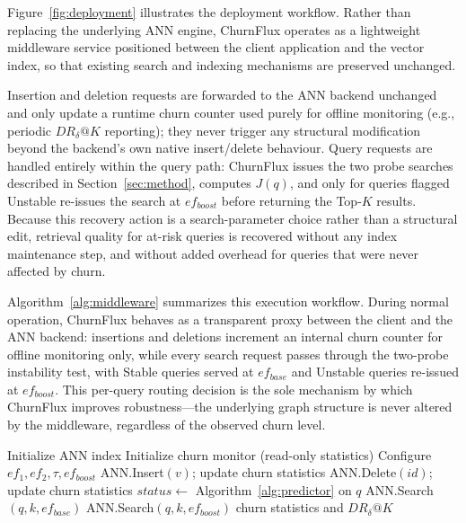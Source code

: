 \documentclass{ieeeaccess}
\begin{document}
Figure~\ref{fig:deployment} illustrates the deployment workflow. Rather than replacing the underlying ANN engine, ChurnFlux operates as a lightweight middleware service positioned between the client application and the vector index, so that existing search and indexing mechanisms are preserved unchanged.

Insertion and deletion requests are forwarded to the ANN backend unchanged and only update a runtime churn counter used purely for offline monitoring (e.g., periodic $DR_{\delta}@K$ reporting); they never trigger any structural modification beyond the backend's own native insert/delete behaviour. Query requests are handled entirely within the query path: ChurnFlux issues the two probe searches described in Section~\ref{sec:method}, computes $J(q)$, and only for queries flagged Unstable re-issues the search at $ef_{boost}$ before returning the Top-$K$ results. Because this recovery action is a search-parameter choice rather than a structural edit, retrieval quality for at-risk queries is recovered without any index maintenance step, and without added overhead for queries that were never affected by churn.

Algorithm~\ref{alg:middleware} summarizes this execution workflow. During normal operation, ChurnFlux behaves as a transparent proxy between the client and the ANN backend: insertions and deletions increment an internal churn counter for offline monitoring only, while every search request passes through the two-probe instability test, with Stable queries served at $ef_{base}$ and Unstable queries re-issued at $ef_{boost}$. This per-query routing decision is the sole mechanism by which ChurnFlux improves robustness---the underlying graph structure is never altered by the middleware, regardless of the observed churn level.

\begin{algorithm}[!t]
\caption{ChurnFlux Middleware API}
\label{alg:middleware}
\begin{algorithmic}[1]
\State Initialize ANN index
\State Initialize churn monitor (read-only statistics)
\State Configure $ef_1,ef_2,\tau,ef_{boost}$
  \State ANN.Insert$(v)$; update churn statistics
\EndIf
{}
  \State ANN.Delete$(id)$; update churn statistics
\EndIf
{}
  \State $status \gets$ Algorithm~\ref{alg:predictor} on $q$
    \State \Return ANN.Search$(q,k,ef_{base})$
  \Else
    \State \Return ANN.Search$(q,k,ef_{boost})$
  \EndIf
\EndIf
{}
  \State \Return churn statistics and $DR_{\delta}@K$
\EndIf
\EndWhile
\end{algorithmic}
\end{algorithm}
\end{document}
